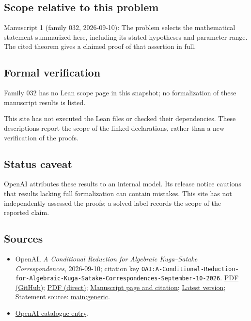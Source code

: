 \documentclass[11pt]{article}
\begin{document}
\subsection{Scope relative to this problem}
Manuscript 1 (family 032, 2026-09-10): The problem selects the mathematical statement summarized here, including its stated hypotheses and parameter range. The cited theorem gives a claimed proof of that assertion in full.

\subsection{Formal verification}
Family 032 has no Lean scope page in this snapshot; no formalization of these manuscript results is listed.

This site has not executed the Lean files or checked their dependencies. These descriptions report the scope of the linked declarations, rather than a new verification of the proofs.

\subsection{Status caveat}
OpenAI attributes these results to an internal model. Its release notice cautions that results lacking full formalization can contain mistakes. This site has not independently assessed the proofs; a solved label records the scope of the reported claim.

\subsection{Sources}
\begin{itemize}
\item OpenAI, \emph{A Conditional Reduction for Algebraic Kuga–Satake Correspondences}, 2026-09-10; citation key \texttt{OAI:A-Conditional-Reduction-for-Algebraic-Kuga-Satake-Correspondences-September-10-2026}. \href{https://github.com/openai/math/blob/adc7f1241b42e322a6451854ab7e4b4c146bf78a/preprints/A-Conditional-Reduction-for-Algebraic-Kuga-Satake-Correspondences-September-10-2026/paper.pdf}{PDF (GitHub)}; \href{https://github.com/openai/math/raw/adc7f1241b42e322a6451854ab7e4b4c146bf78a/preprints/A-Conditional-Reduction-for-Algebraic-Kuga-Satake-Correspondences-September-10-2026/paper.pdf}{PDF (direct)}; \href{https://github.com/openai/math/blob/adc7f1241b42e322a6451854ab7e4b4c146bf78a/preprints/A-Conditional-Reduction-for-Algebraic-Kuga-Satake-Correspondences-September-10-2026/README.md}{Manuscript page and citation}; \href{https://github.com/openai/math/blob/main/preprints/A-Conditional-Reduction-for-Algebraic-Kuga-Satake-Correspondences-September-10-2026/paper.pdf}{Latest version}; Statement source: \href{https://github.com/openai/math/blob/adc7f1241b42e322a6451854ab7e4b4c146bf78a/preprints/A-Conditional-Reduction-for-Algebraic-Kuga-Satake-Correspondences-September-10-2026/build/sections/introduction.tex\#L36}{main:generic}.
\item \href{https://github.com/openai/math/blob/adc7f1241b42e322a6451854ab7e4b4c146bf78a/CONTENTS.md}{OpenAI catalogue entry}.
\end{itemize}
\end{document}
